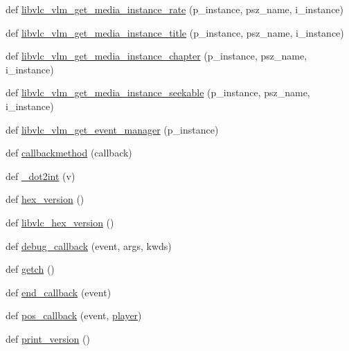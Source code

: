 \begin{DoxyCompactItemize}
\item 
def \hyperlink{namespacesrc_1_1lib_1_1vlc_abe5329f9b8ecb68f01b72c1ecf1bf9c4}{libvlc\+\_\+vlm\+\_\+get\+\_\+media\+\_\+instance\+\_\+rate} (p\+\_\+instance, psz\+\_\+name, i\+\_\+instance)
\item 
def \hyperlink{namespacesrc_1_1lib_1_1vlc_a114fcdbe16e448f480a5f623c2e189fb}{libvlc\+\_\+vlm\+\_\+get\+\_\+media\+\_\+instance\+\_\+title} (p\+\_\+instance, psz\+\_\+name, i\+\_\+instance)
\item 
def \hyperlink{namespacesrc_1_1lib_1_1vlc_a05a3558d478d8f0ace8a4130f954e8c4}{libvlc\+\_\+vlm\+\_\+get\+\_\+media\+\_\+instance\+\_\+chapter} (p\+\_\+instance, psz\+\_\+name, i\+\_\+instance)
\item 
def \hyperlink{namespacesrc_1_1lib_1_1vlc_a55677b8caad905f000f5f9bcab0c1039}{libvlc\+\_\+vlm\+\_\+get\+\_\+media\+\_\+instance\+\_\+seekable} (p\+\_\+instance, psz\+\_\+name, i\+\_\+instance)
\item 
def \hyperlink{namespacesrc_1_1lib_1_1vlc_a6ac380bb1a235fd6f639e2dea4e556aa}{libvlc\+\_\+vlm\+\_\+get\+\_\+event\+\_\+manager} (p\+\_\+instance)
\item 
def \hyperlink{namespacesrc_1_1lib_1_1vlc_a5b0549b31916e3b79d188e1e301eac2c}{callbackmethod} (callback)
\item 
def \hyperlink{namespacesrc_1_1lib_1_1vlc_a5d12ca37f1c5576643ffbb0c428d3734}{\+\_\+dot2int} (v)
\item 
def \hyperlink{namespacesrc_1_1lib_1_1vlc_a12c0d607f17935158595b70f973067aa}{hex\+\_\+version} ()
\item 
def \hyperlink{namespacesrc_1_1lib_1_1vlc_a11f50254ac9914b533368ea04c7f9df4}{libvlc\+\_\+hex\+\_\+version} ()
\item 
def \hyperlink{namespacesrc_1_1lib_1_1vlc_a010e523221624daa0eb8e6c87ebcd4d8}{debug\+\_\+callback} (event, args, kwds)
\item 
def \hyperlink{namespacesrc_1_1lib_1_1vlc_a76a09aca5866dd7aeb751f220b998ef7}{getch} ()
\item 
def \hyperlink{namespacesrc_1_1lib_1_1vlc_a9f6a382bb030dc2201a99dc813ceed48}{end\+\_\+callback} (event)
\item 
def \hyperlink{namespacesrc_1_1lib_1_1vlc_a8d8ede7f23e3bed2e1249ca8dcf9b19a}{pos\+\_\+callback} (event, \hyperlink{namespacesrc_1_1lib_1_1vlc_a3245e13ab40950beac9bda1e4091c4fa}{player})
\item 
def \hyperlink{namespacesrc_1_1lib_1_1vlc_a46aa970e5dfc15d0f88ba4b81a3d8f34}{print\+\_\+version} ()
\item 

\end{DoxyCompactItemize}
